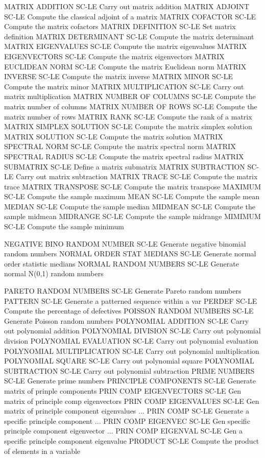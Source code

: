 MATRIX ADDITION             SC-LE Carry out matrix addition
MATRIX ADJOINT              SC-LE Compute the classical adjoint of a matrix
MATRIX COFACTOR             SC-LE Compute the matrix cofactors
MATRIX DEFINITION           SC-LE Set matrix definition
MATRIX DETERMINANT          SC-LE Compute the matrix determinant
MATRIX EIGENVALUES          SC-LE Compute the matrix eigenvalues
MATRIX EIGENVECTORS         SC-LE Compute the matrix eigenvectors
MATRIX EUCLIDEAN NORM       SC-LE Compute the matrix Euclidean norm
MATRIX INVERSE              SC-LE Compute the matrix inverse
MATRIX MINOR                SC-LE Compute the matrix minor
MATRIX MULTIPLICATION       SC-LE Carry out matrix multiplication
MATRIX NUMBER OF COLUMNS    SC-LE Compute the matrix number of columns
MATRIX NUMBER OF ROWS       SC-LE Compute the matrix number of rows
MATRIX RANK                 SC-LE Compute the rank of a matrix
MATRIX SIMPLEX SOLUTION     SC-LE Compute the matrix simplex solution
MATRIX SOLUTION             SC-LE Compute the matrix solution
MATRIX SPECTRAL NORM        SC-LE Compute the matrix spectral norm
MATRIX SPECTRAL RADIUS      SC-LE Compute the matrix spectral radius
MATRIX SUBMATRIX            SC-LE Define a matrix submatrix
MATRIX SUBTRACTION          SC-LE Carry out matrix subtraction
MATRIX TRACE                SC-LE Compute the matrix trace
MATRIX TRANSPOSE            SC-LE Compute the matrix transpose
MAXIMUM                     SC-LE Compute the sample maximum
MEAN                        SC-LE Compute the sample mean
MEDIAN                      SC-LE Compute the sample median
MIDMEAN                     SC-LE Compute the sample midmean
MIDRANGE                    SC-LE Compute the sample midrange
MIMIMUM                     SC-LE Compute the sample minimum

NEGATIVE BINO RANDOM NUMBER SC-LE Generate negative binomial random numbers
NORMAL ORDER STAT MEDIANS   SC-LE Generate normal order statistic medians
NORMAL RANDOM NUMBERS       SC-LE Generate normal N(0,1) random numbers

PARETO RANDOM NUMBERS       SC-LE Generate Pareto random numbers
PATTERN                     SC-LE Generate a patterned sequence within a var
PERDEF                      SC-LE Compute the percentage of defectives
POISSON RANDOM NUMBERS      SC-LE Generate Poisson random numbers
POLYNOMIAL ADDITION         SC-LE Carry out polynomial addition
POLYNOMIAL DIVISION         SC-LE Carry out polynomial division
POLYNOMIAL EVALUATION       SC-LE Carry out polynomial evaluation
POLYNOMIAL MULTIPLICATION   SC-LE Carry out polynomial multiplication
POLYNOMIAL SQUARE           SC-LE Carry out polynomial square
POLYNOMIAL SUBTRACTION      SC-LE Carry out polynomial subtraction
PRIME NUMBERS               SC-LE Generate prime numbers
PRINCIPLE COMPONENTS        SC-LE Generate matrix of prinple components
PRIN COMP EIGENVECTORS      SC-LE Gen matrix of principle comp eigenvectors
PRIN COMP EIGENVALUES       SC-LE Gen matrix of principle component eigenvalues
... PRIN COMP               SC-LE Generate a specific principle component
... PRIN COMP EIGENVEC      SC-LE Gen specific principle component eigenvector
... PRIN COMP EIGENVAL      SC-LE Gen a specific principle component eigenvalue
PRODUCT                     SC-LE Compute the product of elements in a variable

